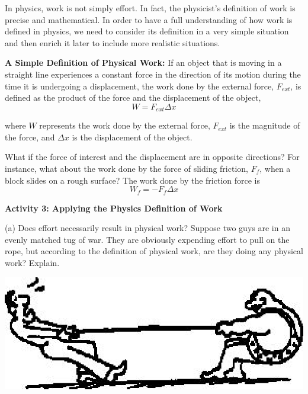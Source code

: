 In physics, work is not simply effort. In fact, the physicist's definition of
work is precise and mathematical. In order to have a full understanding of how
work is defined in physics, we need to consider its definition in a very simple
situation and then enrich it later to include more realistic situations.

\textbf{A Simple Definition of Physical Work:} If an object that is moving in
a straight line experiences a constant force in the direction of its motion
during the time it is undergoing a displacement, the work done by the external
force, \( F_{ext} \), is defined as the product of the force and the displacement of the object, 
\[
W=F_{ext}\Delta x\]


where $W$ represents the work done by the external force, \( F_{ext} \) is the
magnitude of the force, and \( \Delta  x\) is the displacement of the object.

What if the force of interest and the displacement are in opposite directions? For instance, what about the work done by the force of sliding friction,
\( F_{f} \), when a block slides on a rough surface? The work done by the friction force is
\[
W_{f}=-F_{f}\Delta x\]

\textbf{Activity 3: Applying the Physics Definition of Work} 

(a) Does effort necessarily result in physical work? Suppose two guys are in
an evenly matched tug of war. They are obviously expending effort to pull on the
rope, but according to the definition of physical work, are they doing any physical
work? Explain.

\vspace{0.3cm}
{\par\centering \includegraphics{work_power/work_power_fig3.eps} \par}
\vspace{0.3cm}

